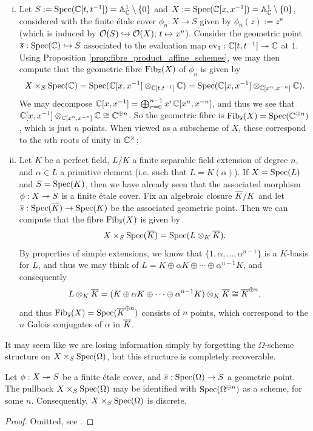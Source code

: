\begin{eg}
	\label{eg:4.2}
	\begin{enumerate}[(i)]
		\item Let $S := \mathrm{Spec}(\mathbb{C}[t,t^{-1}]) = \mathbb{A}^1_{\mathbb{C}} \setminus\{0\}$ and $X := \mathrm{Spec}(\mathbb{C}[x,x^{-1}]) = \mathbb{A}^1_{\mathbb{C}} \setminus \{0\}$, considered with the finite \'etale cover $\phi_n : X \to S$ given by $\phi_n(z) := z^n$ (which is induced by $\mathcal{O}(S) \hookrightarrow \mathcal{O}(X);\, t \mapsto x^n$). Consider the geometric point $\overline{s} : \mathrm{Spec}(\mathbb{C}) \hookrightarrow S$ associated to the evaluation map $\mathrm{ev}_1 : \mathbb{C}[t,t^{-1}] \twoheadrightarrow \mathbb{C}$ at $1$. Using Proposition \ref{prop:fibre_product_affine_schemes}, we may then compute that the geometric fibre $\mathrm{Fib}_{\overline{s}}(X)$ of $\phi_n$ is given by 
		\[
			X \times_S \mathrm{Spec}(\mathbb{C}) = \mathrm{Spec}(\mathbb{C}[x, x^{-1}] \otimes_{\mathbb{C}[t,t^{-1}]} \mathbb{C}) = \mathrm{Spec}(\mathbb{C}[x,x^{-1}] \otimes_{\mathbb{C}[x^n, x^{-n}]} \mathbb{C}).
		\]
		We may decompose $\mathbb{C}[x,x^{-1}] = \bigoplus_{r=0}^{n-1} x^r \mathbb{C}[x^n, x^{-n}]$, and thus we see that $\mathbb{C}[x,x^{-1}] \otimes_{\mathbb{C}[x^n, x^{-n}]} \mathbb{C} \cong \mathbb{C}^{\oplus n}$. So the geometric fibre is $\mathrm{Fib}_{\overline{s}}(X) = \mathrm{Spec}(\mathbb{C}^{\oplus n})$, which is just $n$ points. When viewed as a subscheme of $X$, these correspond to the $n$th roots of unity in $\mathbb{C}^\times$;
		\item Let $K$ be a perfect field, $L/K$ a finite separable field extension of degree $n$, and $\alpha \in L$ a primitive element (i.e. such that $L = K(\alpha)$). If $X = \mathrm{Spec}(L)$ and $S = \mathrm{Spec}(K)$, then we have already seen that the associated morphism $\phi : X \twoheadrightarrow S$ is a finite \'etale cover. Fix an algebraic closure $\overline{K}/K$ and let $\overline{s} : \mathrm{Spec}(\overline{K}) \to \mathrm{Spec}(K)$ be the associated geometric point. Then we can compute that the fibre $\mathrm{Fib}_{\overline{s}}(X)$ is given by 
		\[
			X \times_S \mathrm{Spec}(\overline{K}) = \mathrm{Spec}(L \otimes_K \overline{K}).
		\]
		By properties of simple extensions, we know that $\{1, \alpha, \ldots, \alpha^{n-1}\}$ is a $K$-basis for $L$, and thus we may think of $L = K \oplus \alpha K \oplus \cdots \oplus \alpha^{n-1} K$, and consequently
		\[
			L \otimes_K \overline{K} = (K \oplus \alpha K \oplus \cdots \oplus \alpha^{n-1} K) \otimes_K \overline{K} \cong \overline{K}^{\oplus n},
		\]
		and thus $\mathrm{Fib}_{\overline{s}}(X) = \mathrm{Spec}(\overline{K}^{\oplus n})$ consists of $n$ points, which correspond to the $n$ Galois conjugates of $\alpha$ in $\overline{K}$.
	\end{enumerate}
\end{eg}

It may seem like we are losing information simply by forgetting the $\Omega$-scheme structure on $X\times_S \mathrm{Spec}(\Omega)$, but this structure is completely recoverable.
\begin{prop}
	Let $\phi : X \twoheadrightarrow S$ be a finite \'etale cover, and $\overline{s}: \mathrm{Spec}(\Omega) \to S$ a geometric point. The pullback $X \times_S \mathrm{Spec}(\Omega)$ may be identified with $\mathrm{Spec}(\Omega^{\oplus n})$ as a scheme, for some $n$. Consequently, $X \times_S \mathrm{Spec}(\Omega)$ is discrete.
\end{prop}
\begin{proof}
	Omitted, see \cite{szamuely09}.  
\end{proof}

